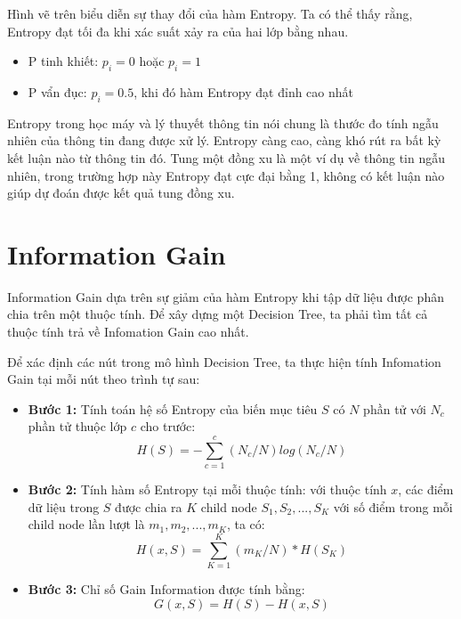 Hình vẽ trên biểu diễn sự thay đổi của hàm Entropy.
Ta có thể thấy rằng, Entropy đạt tối đa khi xác suất xảy ra của hai lớp bằng nhau.

\begin{itemize}
    \item P tinh khiết: $p_i=0$ hoặc $p_i=1$
    \item P vẩn đục: $p_i=0.5$, khi đó hàm Entropy đạt đỉnh cao nhất
\end{itemize}

Entropy trong học máy và lý thuyết thông tin nói chung là thước đo tính ngẫu nhiên
của thông tin đang được xử lý. Entropy càng cao, càng khó rút ra bất kỳ kết luận nào
từ thông tin đó.
Tung một đồng xu là một ví dụ về thông tin ngẫu nhiên,
trong trường hợp này Entropy đạt cực đại bằng 1,
không có kết luận nào giúp dự đoán được kết quả tung đồng xu.

\section{Information Gain}
Information Gain dựa trên sự giảm của hàm Entropy khi tập dữ liệu được phân chia
trên một thuộc tính. Để xây dựng một Decision Tree, ta phải tìm tất cả thuộc tính
trả về Infomation Gain cao nhất.

Để xác định các nút trong mô hình Decision Tree, ta thực hiện tính
Infomation Gain tại mỗi nút theo trình tự sau:

\begin{itemize}
    \item \textbf{Bước 1:} Tính toán hệ số Entropy của biến mục tiêu $S$ có $N$ phần tử
    với $N_c$ phần tử thuộc lớp $c$ cho trước:
    \begin{equation*}
        H(S) = -\sum_{c=1}^{c}(N_c/N)log(N_c/N)
    \end{equation*}

    \item \textbf{Bước 2:} Tính hàm số Entropy tại mỗi thuộc tính:
    với thuộc tính $x$, các điểm dữ liệu trong $S$ được chia ra $K$
    child node $S_1, S_2,..., S_K$ với số điểm trong mỗi child node
    lần lượt là $m_1, m_2,..., m_K$, ta có:
    \begin{equation*}
        H(x, S) = \sum_{K=1}^{K}(m_K/N)*H(S_K)
    \end{equation*}

    \item \textbf{Bước 3:} Chỉ số Gain Information được tính bằng:
    \begin{equation*}
        G(x, S) = H(S) - H(x, S)
    \end{equation*}
\end{itemize}

